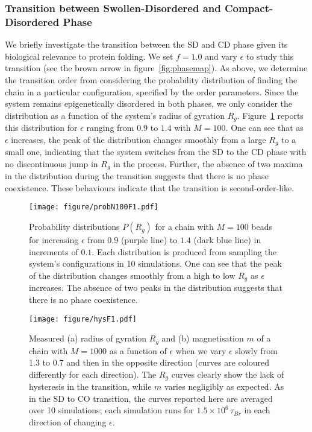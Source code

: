 \documentclass[12pt]{article}
\newcommand*{\DataFig}{/Users/MichaelChiang/Desktop/epigenetics_data/}
\begin{document}
\FloatBarrier
\subsubsection{Transition between Swollen-Disordered and Compact-Disordered Phase}
We briefly investigate the transition between the SD and CD phase given its biological relevance to protein folding. We set $f = 1.0$ and vary $\epsilon$ to study this transition (see the brown arrow in figure~\ref{fig:phasemap}). As above, we determine the transition order from considering the probability distribution of finding the chain in a particular configuration, specified by the order parameters. Since the system remains epigenetically disordered in both phases, we only consider the distribution as a function of the system's radius of gyration $R_g$. Figure~\ref{fig:probN100F1} reports this distribution for $\epsilon$ ranging from $0.9$ to $1.4$ with $M = 100$. One can see that as $\epsilon$ increases, the peak of the distribution changes smoothly from a large $R_g$ to a small one, indicating that the system switches from the SD to the CD phase with no discontinuous jump in $R_g$ in the process. Further, the absence of two maxima in the distribution during the transition suggests that there is no phase coexistence. These behaviours indicate that the transition is second-order-like. 
\begin{figure}[h]
	\centering
	\texttt{[image: figure/probN100F1.pdf]}
	\caption{Probability distributions $P(R_g)$ for a chain with $M = 100$ beads for increasing $\epsilon$ from $0.9$ (purple line) to $1.4$ (dark blue line) in increments of $0.1$. Each distribution is produced from sampling the system's configurations in 10 simulations. One can see that the peak of the distribution changes smoothly from a high to low $R_g$ as $\epsilon$ increases. The absence of two peaks in the distribution suggests that there is no phase coexistence.}
	\label{fig:probN100F1}
\end{figure}
\begin{figure}[h]
	\centering
	\texttt{[image: figure/hysF1.pdf]}
	\caption{Measured (a) radius of gyration $R_g$ and (b) magnetisation $m$ of a chain with $M = 1000$ as a function of $\epsilon$ when we vary $\epsilon$ slowly from 1.3 to 0.7 and then in the opposite direction (curves are coloured differently for each direction). The $R_g$ curves clearly show the lack of hysteresis in the transition, while $m$ varies negligibly as expected. As in the SD to CO transition, the curves reported here are averaged over 10 simulations; each simulation runs for $1.5\times10^6\,\tau_{Br}$ in each direction of changing $\epsilon$.}
	\label{fig:hysF1}
\end{figure}
\end{document}
